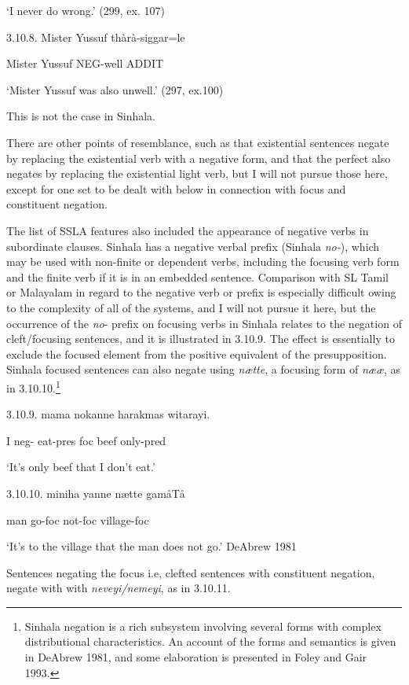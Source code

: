 \documentclass[letterpaper]{article}
\begin{document}
 `I never do wrong.'   (299, ex. 107)

3.10.8. 
\ea
\gll Mister Yussuf thàrà-siggar=le

 Mister  Yussuf NEG-well ADDIT

 `Mister Yussuf was also unwell.'  (297, ex.100)

This is not the case in Sinhala.

 There are other points of resemblance, such as that existential sentences negate by replacing the existential verb with a negative form, and that the perfect also negates by replacing the existential light verb, but I will not pursue those here, except for one set to be dealt with below in connection with focus and constituent negation.

 The list of SSLA features also included the appearance of negative verbs in subordinate clauses.  Sinhala has a negative verbal prefix (Sinhala \textit{no-}), which may be used with non-finite or dependent verbs, including the focusing verb form and the finite verb if it is in an embedded sentence. Comparison with SL Tamil or Malayalam in regard to the negative verb or prefix is especially  difficult owing to the complexity of all of the  systems, and I will not pursue it here, but the occurrence of the \textit{no}-  prefix on focusing verbs in Sinhala relates to the negation of cleft/focusing sentences, and it is illustrated in 3.10.9. The effect is essentially to exclude the focused element from the positive equivalent of the presupposition. Sinhala focused sentences can also negate using \textit{n{\ae}tte}, a focusing form of \textit{n{\ae}{\ae}}, as in 3.10.10.\footnote{Sinhala
  negation is a rich subsystem involving several forms with complex distributional characteristics. An account of the forms and semantics is given in DeAbrew 1981, and some elaboration is presented in Foley and Gair 1993.}

3.10.9. 
\ea
\gll mama nokanne  harakmas witarayi.

 I  neg- eat-pres foc beef only-pred

 `It's only beef that I don't eat.'

3.10.10.  
\ea
\gll miniha  yanne n{\ae}tte gam{\aa}T{\aa}

 man  go-foc not-foc  village-foc

 `It's to the village that the man does not go.' DeAbrew 1981

 Sentences negating the focus i.e, clefted sentences with constituent negation, negate with with \textit{neveyi/nemeyi}, as in 3.10.11. 
\end{document}
